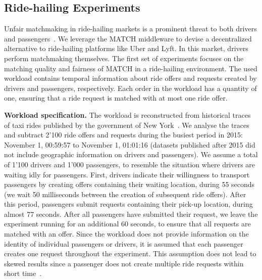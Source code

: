 \subsection{Ride-hailing Experiments}
\label{sec:taxi_experiments}
Unfair matchmaking in ride-hailing markets is a prominent threat to both drivers and passengers~\cite{bokanyi2019ride,calo2017taking}.
We leverage the MATCH middleware to devise a decentralized alternative to ride-hailing platforms like Uber and Lyft. %
In this market, drivers perform matchmaking themselves.
The first set of experiments focuses on the matching quality and fairness of MATCH in a ride-hailing environment.
The used workload contains temporal information about ride offers and requests created by drivers and passengers, respectively.
Each order in the workload has a quantity of one, ensuring that a ride request is matched with at most one ride offer.

\textbf{Workload specification.}
The workload is reconstructed from historical traces of taxi rides published by the government of New York~\cite{tlc2017nyc}.
We analyse the traces and subtract 2'100 ride offers and requests during the busiest period in 2015: November 1, 00:59:57 to November 1, 01:01:16 (datasets published after 2015 did not include geographic information on drivers and passengers).
We assume a total of 1'100 drivers and 1'000 passengers, to resemble the situation where drivers are waiting idly for passengers.
First, drivers indicate their willingness to transport passengers by creating offers containing their waiting location, during 55 seconds (we wait 50 milliseconds between the creation of subsequent ride offers).
After this period, passengers submit requests containing their pick-up location, during almost 77 seconds.
After all passengers have submitted their request, we leave the experiment running for an additional 60 seconds, to ensure that all requests are matched with an offer.
Since the workload does not provide information on the identity of individual passengers or drivers, it is assumed that each passenger creates one request throughout the experiment. %
This assumption does not lead to skewed results since a passenger does not create multiple ride requests within short time~\cite{pham2017oride}.

